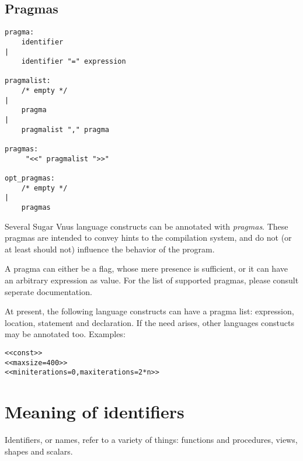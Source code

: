\documentclass[a4paper]{article}
\newcommand{\langnm}{Sugar Vnus}
\newcommand{\defn}[1]{{\em #1}\index{#1}}
\begin{document}
\subsection{Pragmas}
\begin{verbatim}
pragma:
    identifier
|
    identifier "=" expression

pragmalist:
    /* empty */
|
    pragma
|
    pragmalist "," pragma

pragmas:
     "<<" pragmalist ">>"

opt_pragmas:
    /* empty */
|
    pragmas

\end{verbatim}
Several {\langnm} language constructs can be annotated with \defn{pragmas}.
These pragmas are intended to convey hints to the compilation system, and
do not (or at least should not) influence the behavior of the program.
\par
A pragma can either be a flag, whose mere presence is sufficient, or it
can have an arbitrary expression as value. For the list of supported pragmas,
please consult seperate documentation.
\par
At present, the following language constructs can have a pragma list:
expression, location, statement and declaration. If the need arises,
other languages constucts may be annotated too.
Examples:
\begin{verbatim}
<<const>>
<<maxsize=400>>
<<miniterations=0,maxiterations=2*n>>
\end{verbatim}

\section{Meaning of identifiers}
Identifiers, or names, refer to a variety of things: functions and procedures,
views, shapes and scalars.
\end{document}
